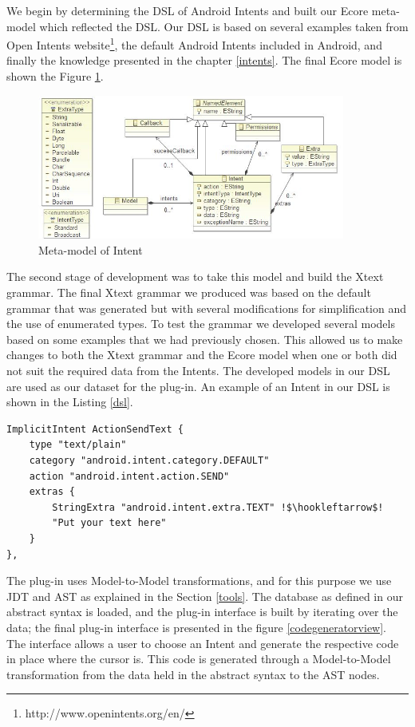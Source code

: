We begin by determining the DSL of Android Intents and built our Ecore meta-model which reflected the DSL. Our DSL is based on several examples taken from Open Intents website\footnote{http://www.openintents.org/en/}, the default Android Intents included in Android, and finally the knowledge presented in the chapter \ref{intents}. The final Ecore model is shown the Figure \ref{meta-model}.

\begin{figure}[t]
\label{meta-model}
  \centering
    \includegraphics[width=0.9\textwidth]{metamodel}
  \caption{Meta-model of Intent}
\end{figure}

The second stage of development was to take this model and build the Xtext grammar. The final Xtext grammar we produced was based on the default grammar that was generated but with several modifications for simplification and the use of enumerated types. To test the grammar we developed several models based on some examples that we had previously chosen. This allowed us to make changes to both the Xtext grammar and the Ecore model when one or both did not suit the required data from the Intents. The developed models in our DSL are used as our dataset for the plug-in. An example of an Intent in our DSL is shown in the Listing \ref{dsl}.

{\footnotesize\begin{lstlisting}[escapechar=!,label=dsl,caption=Intent in DSL]
ImplicitIntent ActionSendText {
	type "text/plain"
	category "android.intent.category.DEFAULT"
	action "android.intent.action.SEND"
	extras {
		StringExtra "android.intent.extra.TEXT" !$\hookleftarrow$!
		"Put your text here"
	}
},
\end{lstlisting}}

The plug-in uses Model-to-Model transformations, and for this purpose we use JDT and AST as explained in the Section \ref{tools}. The database as defined in our abstract syntax is loaded, and the plug-in interface is built by iterating over the data; the final plug-in interface is presented in the figure \ref{codegeneratorview}. The interface allows a user to choose an Intent and generate the respective code in place where the cursor is. This code is generated through a Model-to-Model transformation from the data held in the abstract syntax to the AST nodes.


